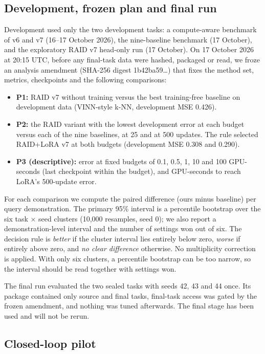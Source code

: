 \documentclass[11pt,a4paper]{article}
\providecommand{\tightlist}{\setlength{\itemsep}{0pt}\setlength{\parskip}{0pt}}
\begin{document}
\subsection{Development, frozen plan and final run}

Development used only the two development tasks: a compute-aware benchmark of v6 and v7 (16--17 October 2026), the nine-baseline benchmark (17 October), and the exploratory RAID v7 head-only run (17 October). On 17 October 2026 at 20:15 UTC, before any final-task data were hashed, packaged or read, we froze an analysis amendment (SHA-256 digest 1b42ba59\ldots) that fixes the method set, metrics, checkpoints and the following comparisons:

\begin{itemize}
\tightlist
\item
  \textbf{P1:} RAID v7 without training versus the best training-free baseline on development data (VINN-style k-NN, development MSE 0.426).
\item
  \textbf{P2:} the RAID variant with the lowest development error at each budget versus each of the nine baselines, at 25 and at 500 updates. The rule selected RAID+LoRA v7 at both budgets (development MSE 0.308 and 0.290).
\item
  \textbf{P3 (descriptive):} error at fixed budgets of 0.1, 0.5, 1, 10 and 100 GPU-seconds (last checkpoint within the budget), and GPU-seconds to reach LoRA's 500-update error.
\end{itemize}

For each comparison we compute the paired difference (ours minus baseline) per query demonstration. The primary 95\% interval is a percentile bootstrap over the six task \ensuremath{\times} seed clusters (10,000 resamples, seed 0); we also report a demonstration-level interval and the number of settings won out of six. The decision rule is \emph{better} if the cluster interval lies entirely below zero, \emph{worse} if entirely above zero, and \emph{no clear difference} otherwise. No multiplicity correction is applied. With only six clusters, a percentile bootstrap can be too narrow, so the interval should be read together with settings won.

The final run evaluated the two sealed tasks with seeds 42, 43 and 44 once. Its package contained only source and final tasks, final-task access was gated by the frozen amendment, and nothing was tuned afterwards. The final stage has been used and will not be rerun.

\subsection{Closed-loop pilot}
\end{document}
